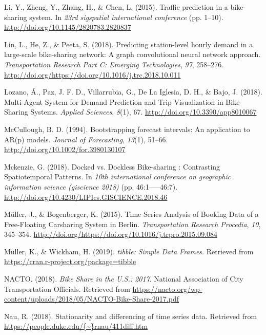 \documentclass[12pt,oneside]{reedthesis}
\begin{document}
\hypertarget{ref-li2015}{}
Li, Y., Zheng, Y., Zhang, H., \& Chen, L. (2015). Traffic prediction in
a bike-sharing system. In \emph{23rd sigspatial international
conference} (pp. 1--10). \url{http://doi.org/10.1145/2820783.2820837}

\hypertarget{ref-lin2018}{}
Lin, L., He, Z., \& Peeta, S. (2018). Predicting station-level hourly
demand in a large-scale bike-sharing network: A graph convolutional
neural network approach. \emph{Transportation Research Part C: Emerging
Technologies}, \emph{97}, 258--276.
\url{http://doi.org/https://doi.org/10.1016/j.trc.2018.10.011}

\hypertarget{ref-lozano2018}{}
Lozano, Á., Paz, J. F. D., Villarrubia, G., De La Iglesia, D. H., \&
Bajo, J. (2018). Multi-Agent System for Demand Prediction and Trip
Visualization in Bike Sharing Systems. \emph{Applied Sciences},
\emph{8}(1), 67. \url{http://doi.org/10.3390/app8010067}

\hypertarget{ref-mccullough1994}{}
McCullough, B. D. (1994). Bootstrapping forecast intervals: An
application to AR(p) models. \emph{Journal of Forecasting},
\emph{13}(1), 51--66. \url{http://doi.org/10.1002/for.3980130107}

\hypertarget{ref-mckenzie2018}{}
Mckenzie, G. (2018). Docked vs. Dockless Bike-sharing : Contrasting
Spatiotemporal Patterns. In \emph{10th international conference on
geographic information science (giscience 2018)} (pp. 46:1-----46:7).
\url{http://doi.org/10.4230/LIPIcs.GISCIENCE.2018.46}

\hypertarget{ref-muller2015}{}
Müller, J., \& Bogenberger, K. (2015). Time Series Analysis of Booking
Data of a Free-Floating Carsharing System in Berlin.
\emph{Transportation Research Procedia}, \emph{10}, 345--354.
\url{http://doi.org/https://doi.org/10.1016/j.trpro.2015.09.084}

\hypertarget{ref-tibble}{}
Müller, K., \& Wickham, H. (2019). \emph{tibble: Simple Data Frames}.
Retrieved from \url{https://cran.r-project.org/package=tibble}

\hypertarget{ref-nacto2018}{}
NACTO. (2018). \emph{Bike Share in the U.S.: 2017}. National Association
of City Transportation Officials. Retrieved from
\url{https://nacto.org/wp-content/uploads/2018/05/NACTO-Bike-Share-2017.pdf}

\hypertarget{ref-nau2018}{}
Nau, R. (2018). Stationarity and differencing of time series data.
Retrieved from
\href{https://people.duke.edu/\%7B~\%7Drnau/411diff.htm}{https://people.duke.edu/\{\textasciitilde{}\}rnau/411diff.htm}
\end{document}

